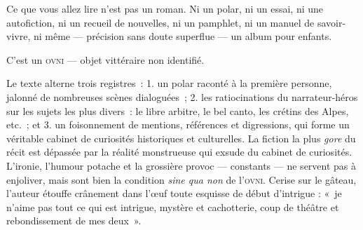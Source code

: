 Ce que vous allez lire n'est pas un roman. Ni un polar, ni un essai,
ni une autofiction, ni un recueil de nouvelles, ni un pamphlet, ni un manuel
de savoir-vivre, ni même — précision sans doute superflue — un album pour enfants.

C'est un \textsc{ovni} — objet vittéraire non identifié.

Le texte alterne trois registres~: 1. un polar raconté à la première personne,
jalonné de nombreuses scènes dialoguées~; 2. les ratiocinations du
narrateur-héros sur les sujets les plus divers~: le libre arbitre, le bel
canto, les crétins des Alpes, etc.~; et 3. un foisonnement de mentions,
références et digressions, qui forme un véritable cabinet de curiosités
historiques et culturelles. La fiction la plus \textit{gore} du récit est
dépassée par la réalité monstrueuse qui exsude du cabinet de curiosités.
L'ironie, l'humour potache et la grossière provoc — constants — ne servent
pas à enjoliver, mais sont bien la condition \textit{sine qua non} de l'\textsc{ovni}. Cerise sur le gâteau, l’auteur étouffe crânement dans l’œuf toute esquisse de début d’intrigue : «~je n’aime pas tout ce qui est intrigue, mystère et cachotterie, coup de théâtre et rebondissement de mes deux~».
